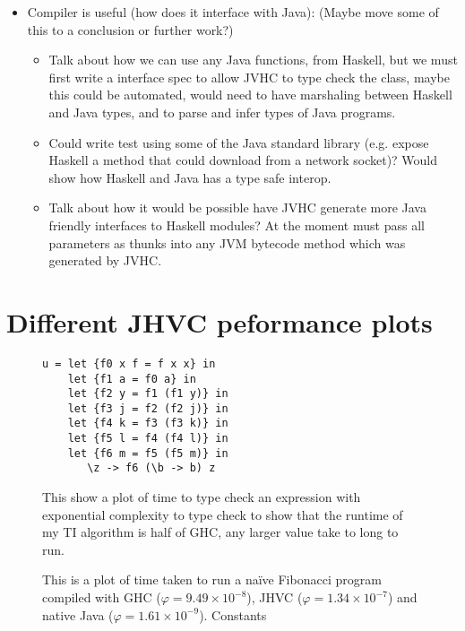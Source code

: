 \documentclass[a4paper]{article}
\begin{document}
\begin{itemize}
  \item Compiler is useful (how does it interface with Java): (Maybe move some of this 
    to a conclusion or further work?)
    \begin{itemize}   
      \item Talk about how we can use any Java functions, from Haskell, but 
    we must first write a interface spec to allow JVHC to type check the class, 
    maybe this could be automated, would need to have marshaling between
    Haskell and Java types, and to parse and infer types of Java programs. 
  \item Could write test using some of the Java standard library (e.g. 
    expose Haskell a method that could download from a network socket)? 
    Would show how Haskell and Java has a type safe interop.
      \item Talk about how it would be possible have JVHC generate 
        more Java friendly interfaces to Haskell modules? At the 
        moment must pass all parameters as thunks into any
        JVM bytecode method which was generated by JVHC.
\end{itemize}


\end{itemize}

\section{Different JHVC peformance plots}

\begin{figure}
  
  \label{ti_exp}
  \caption{This show a plot of time to type check 
    an expression with exponential complexity to type check
    to show that the runtime of my TI algorithm is half of 
    GHC, any larger value take to long to run.}
\begin{verbatim}
u = let {f0 x f = f x x} in
    let {f1 a = f0 a} in
    let {f2 y = f1 (f1 y)} in
    let {f3 j = f2 (f2 j)} in
    let {f4 k = f3 (f3 k)} in
    let {f5 l = f4 (f4 l)} in
    let {f6 m = f5 (f5 m)} in
       \z -> f6 (\b -> b) z
\end{verbatim}
\end{figure}


\begin{figure}
  
  \caption{This is a plot of time taken to run  a na\"ive Fibonacci program
  compiled with GHC (\mbox{$\varphi =9.49\times 10^{-8}$}), JHVC ($\varphi = 1.34\times 10^{-7}$) and native Java (\mbox{$\varphi=1.61\times 10^{-9}$}). Constants }
  \label{fib_timing}
\end{figure}
\end{document}
